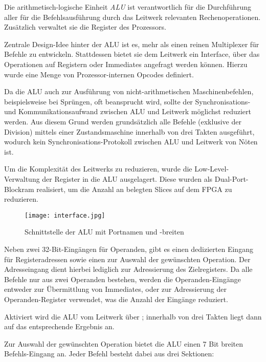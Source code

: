 \label{ch:alu}

Die arithmetisch-logische Einheit \textit{ALU} ist verantwortlich f\"ur die Durchf\"uhrung aller f\"ur die Befehlsausf\"uhrung durch das Leitwerk relevanten Rechenoperationen. Zus\"atzlich verwaltet sie die Register des Prozessors.


Zentrale Design-Idee hinter der ALU ist es, mehr als einen reinen Multiplexer f\"ur Befehle zu entwickeln. Stattdessen bietet sie dem Leitwerk ein Interface,
\"uber das Operationen auf Registern oder Immediates angefragt werden k\"onnen. Hierzu wurde eine Menge von Prozessor-internen Opcodes definiert.

Da die ALU auch zur Ausf\"uhrung von nicht-arithmetischen Maschinenbefehlen, beispielsweise bei Spr\"ungen, oft beansprucht wird, sollte der Synchronisations- und Kommunikationsaufwand zwischen ALU und Leitwerk m\"oglichst reduziert werden.
Aus diesem Grund werden grunds\"atzlich alle Befehle (exklusive der Division) mittels einer Zustandsmaschine innerhalb von drei Takten ausgef\"uhrt, wodurch kein Synchronisations-Protokoll zwischen ALU und Leitwerk von N\"oten ist.

Um die Komplexit\"at des Leitwerks zu reduzieren, wurde die Low-Level-Verwaltung der Register in die ALU ausgelagert. Diese wurden als Dual-Port-Blockram realisiert, um die Anzahl an belegten Slices auf dem FPGA zu reduzieren.

\begin{figure}[H]
	\centering
	\label{fig:aluinterface}
		\texttt{[image: interface.jpg]}
	\caption[Schnittstelle der ALU-Einheit]{Schnittstelle der ALU mit Portnamen und -breiten}
\end{figure}

Neben zwei 32-Bit-Eing\"angen f\"ur Operanden, gibt es einen dedizierten Eingang f\"ur Registeradressen sowie einen zur Auswahl der gew\"unschten Operation. 
Der Adresseingang dient hierbei lediglich zur Adressierung des Zielregisters. Da alle Befehle nur aus zwei Operanden bestehen, werden die Operanden-Eing\"ange entweder zur \"Ubermittlung von Immediates, oder zur Adressierung der Operanden-Register verwendet, was die Anzahl der Eing\"ange reduziert.

Aktiviert wird die ALU vom Leitwerk \"uber ; innerhalb von drei Takten liegt dann auf  das entsprechende Ergebnis an.

Zur Auswahl der gew\"unschten Operation bietet die ALU einen 7 Bit breiten Befehls-Eingang an.
Jeder Befehl besteht dabei aus drei Sektionen\vspace{10pt}:


